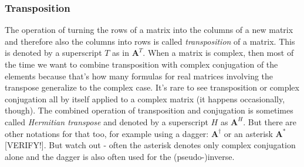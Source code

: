 
\subsubsection{Transposition}
The operation of turning the rows of a matrix into the columns of a new matrix and therefore also the columns into rows is called \emph{transposition} of a matrix. This is denoted by a superscript $T$ as in $\mathbf{A}^T$. When a matrix is complex, then most of the time we want to combine transposition with complex conjugation of the elements because that's how many formulas for real matrices involving the transpose generalize to the complex case. It's rare to see transposition or complex conjugation all by itself applied to a complex matrix (it happens occasionally, though). The combined operation of transposition and conjugation is sometimes called \emph{Hermitian transpose} and denoted by a superscript $H$ as $\mathbf{A}^H$. But there are other notations for that too, for example using a dagger: $\mathbf{A}^\dagger$ or an asterisk $\mathbf{A}^*$ [VERIFY!]. But watch out - often the asterisk denotes only complex conjugation alone and the dagger is also often used for the (pseudo-)inverse.


